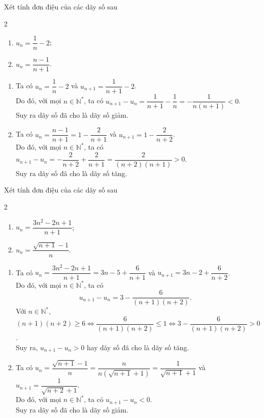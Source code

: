 \begin{bt}%
	Xét tính đơn điệu của các dãy số sau
	\begin{multicols}{2}
		\begin{enumerate}
			\item $u_n=\dfrac{1}{n}-2$;
			\item $u_n=\dfrac{n-1}{n+1}$.
		\end{enumerate}
	\end{multicols}
	\loigiai 
	{
	\begin{enumerate}
		\item Ta có $u_n=\dfrac{1}{n}-2$ và $u_{n+1}=\dfrac{1}{n+1}-2$.\\
		Do đó, với mọi $n\in \mathbb{N}^*$, ta có $u_{n+1}-u_n=\dfrac{1}{n+1}-\dfrac{1}{n}=-\dfrac{1}{n(n+1)}<0$.\\
		Suy ra dãy số đã cho là dãy số giảm.
		\item Ta có $u_n=\dfrac{n-1}{n+1}=1-\dfrac{2}{n+1}$ và $u_{n+1}=1-\dfrac{2}{n+2}$.\\
		Do đó, với mọi $n\in \mathbb{N}^*$, ta có $u_{n+1}-u_n=-\dfrac{2}{n+2}+\dfrac{2}{n+1}=\dfrac{2}{(n+2)(n+1)}>0$.\\
		Suy ra dãy số đã cho là dãy số tăng.
	\end{enumerate}
	}
\end{bt}

\begin{bt}%
	Xét tính đơn điệu của các dãy số sau
	\begin{multicols}{2}
		\begin{enumerate}
			\item $u_n=\dfrac{3n^2-2n+1}{n+1}$;
			\item $u_n=\dfrac{\sqrt{n+1}-1}{n}$.
		\end{enumerate}
	\end{multicols}
	\loigiai 
	{
		\begin{enumerate}
			\item Ta có $u_n=\dfrac{3n^2-2n+1}{n+1}=3n-5+\dfrac{6}{n+1}$ và $u_{n+1}=3n-2+\dfrac{6}{n+2}$.\\
			Do đó, với mọi $n\in \mathbb{N}^*$, ta có $$u_{n+1}-u_n=3-\dfrac{6}{(n+1)(n+2)}.$$
			Với $n\in \mathbb{N}^*$, $(n+1)(n+2)\ge 6\Leftrightarrow \dfrac{6}{(n+1)(n+2)}\le 1\Leftrightarrow 3-\dfrac{6}{(n+1)(n+2)}>0$.\\
			Suy ra, $u_{n+1}-u_n>0$ hay dãy số đã cho là dãy số tăng.
			\item Ta có $u_n=\dfrac{\sqrt{n+1}-1}{n}=\dfrac{n}{n\left(\sqrt{n+1}+1\right)}=\dfrac{1}{\sqrt{n+1}+1}$ và $u_{n+1}=\dfrac{1}{\sqrt{n+2}+1}$.\\
			Do đó, với mọi $n\in \mathbb{N}^*$, ta có $u_{n+1}-u_n<0$.\\
			Suy ra dãy số đã cho là dãy số giảm.
		\end{enumerate}
	}
\end{bt}

